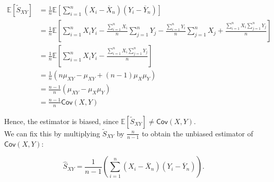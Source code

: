 \documentclass[10pt,landscape]{article}
\begin{document}
\begin{align*}
\mathbb{E}\left[\widetilde{S}_{XY}\right]&=\frac{1}{n}\mathbb{E}\left[\sum _{i=1}^ n \left(X_ i - \overline{X}_ n\right)\left(Y_ i - \overline{Y}_ n \right)\right]\\
&=\frac{1}{n}\mathbb{E}\left[\sum_{i=1}^n X_iY_i  - \frac{\sum_{i=1}^n X_i}{n}\sum_{j=1}^n Y_j  - \frac{\sum_{i=1}^n Y_i}{n}\sum_{j=1}^n X_j  + \frac{\sum_{i=1}^n X_i \sum_{j=1}^n Y_j}{n}\right]\\
&=\frac{1}{n}\mathbb{E}\left[\sum_{i=1}^n X_iY_i    - \frac{\sum_{i=1}^n X_i \sum_{j=1}^n Y_j}{n}\right]\\
&=\frac{1}{n}\left(n\mu_{XY}    - \mu_{XY}+(n-1)\mu_X\mu_Y\right)\\
&=\frac{n-1}{n}\left(\mu_{XY}-\mu_X\mu_Y\right)\\
&=\frac{n-1}{n}\textsf{Cov}(X,Y)
\end{align*}

Hence, the estimator is biased, since $\mathbb E[\widetilde{S}_{XY}] \ne \textsf{Cov}(X,Y).$\\

We can fix this by multiplying $\widetilde S_{XY}$ by $\frac{n}{n-1}$ to obtain the unbiased estimator of $\textsf{Cov}(X,Y)$:

$$\widehat S_{XY}= \frac{1}{n-1}\left(\sum_{i=1}^n(X_i-\overline X_n) (Y_i-\overline Y_n)\right).$$
\end{document}
